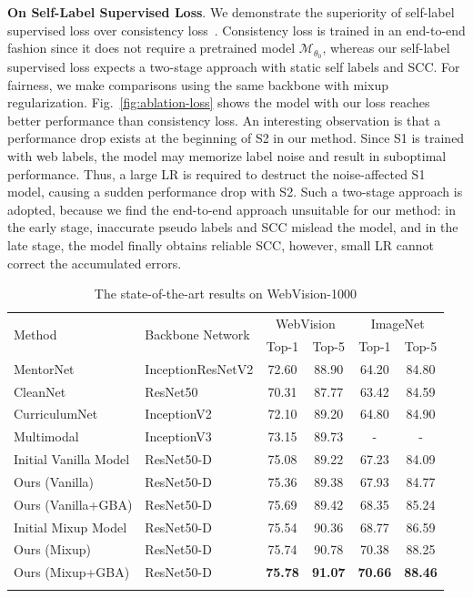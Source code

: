 \documentclass[runningheads]{llncs}
\begin{document}
\textbf{On Self-Label Supervised Loss}.
We demonstrate the superiority of self-label supervised loss over consistency loss~\cite{berthelot2019mixmatch,xie2019unsupervised}. 
Consistency loss is trained in an end-to-end fashion since it does not require a pretrained model $\mathcal{M}_{\theta_0}$, 
whereas our self-label supervised loss expects a two-stage approach with static self labels and SCC.
For fairness, we make comparisons using the same backbone with mixup regularization. Fig.~\ref{fig:ablation-loss} shows the model with our loss reaches better performance than consistency loss. An interesting observation is that a performance drop exists at the beginning of S2 in our method. 
Since S1 is trained with web labels, the model may memorize label noise and result in suboptimal performance. Thus, a large LR is required to destruct the noise-affected S1 model, causing a sudden performance drop with S2. Such a two-stage approach is adopted, because we find the end-to-end approach unsuitable for our method: in the early stage, inaccurate pseudo labels and SCC mislead the model, and in the late stage, the model finally obtains reliable SCC, however, small LR cannot correct the accumulated errors.

\begin{table}[b!]
\caption{The state-of-the-art results on WebVision-1000}
\label{tab:web1000}
	\centering
	\begin{tabular}{llcccc}
		\toprule
		\multicolumn{1}{l}{\multirow{2}{*}{Method}}  & \multicolumn{1}{l}{\multirow{2}{*}{Backbone Network}} & \multicolumn{2}{c}{WebVision} & \multicolumn{2}{c}{ImageNet} \\
		& \multicolumn{1}{c}{} & \multicolumn{1}{c}{Top-1} & \multicolumn{1}{c}{Top-5} & \multicolumn{1}{c}{Top-1} & \multicolumn{1}{c}{Top-5} \\
		\midrule
		MentorNet \cite{jiang2018mentornet} &InceptionResNetV2&72.60&88.90&64.20&84.80\\
		CleanNet \cite{lee2018cleannet} &ResNet50&70.31&87.77&63.42&84.59\\
		CurriculumNet \cite{guo2018curriculumnet} &InceptionV2&72.10&89.20&64.80&84.90\\
		Multimodal \cite{shah2019inferring} & InceptionV3&73.15&89.73&-&-\\
		\midrule
		Initial Vanilla Model & ResNet50-D & 75.08 & 89.22 & 67.23 & 84.09\\
		Ours (Vanilla) & ResNet50-D & 75.36 & 89.38 & 67.93 & 84.77\\
		Ours (Vanilla+GBA) & ResNet50-D & 75.69 & 89.42 & 68.35 & 85.24\\
		\midrule
		Initial Mixup Model & ResNet50-D & 75.54 & 90.36 & 68.77 & 86.59 \\
		Ours (Mixup) & ResNet50-D &75.74&90.78&70.38&88.25\\
		Ours (Mixup+GBA)& ResNet50-D &\textbf{75.78}&\textbf{91.07}&\textbf{70.66}&\textbf{88.46}\\
		\bottomrule
		\noalign{\bigskip}
	\end{tabular}
\end{table}
\end{document}
